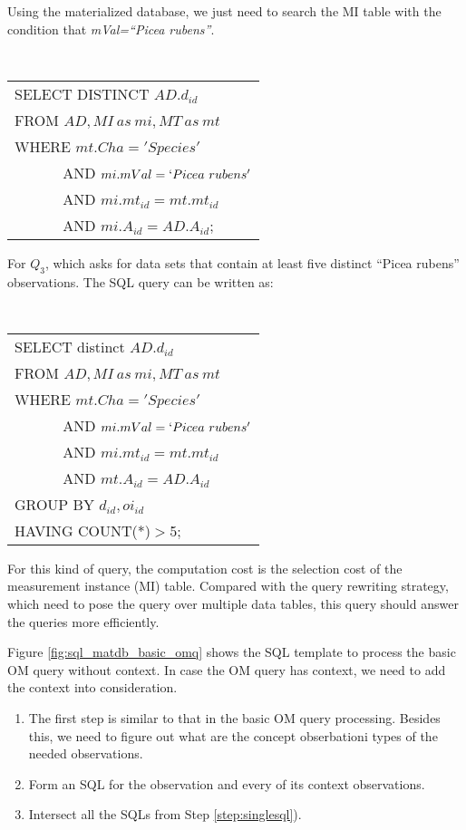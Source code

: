 \begin{example} \label{eg:materialize_db_q1}
Using the  materialized database,  we just need to search the MI table
with the condition that {\em mVal=``Picea rubens''}.

\vspace{0.1in}
{\tt 
\begin{tabular}{l}
SELECT DISTINCT $AD.d_{id}$\\
FROM $AD, MI~as~mi, MT~as~mt$\\ 
WHERE $mt.Cha='Species'$ \\
$\qquad\quad$ AND $mi.mVal = `Picea~rubens'$\\
$\qquad\quad$ AND $mi.mt_{id}=mt.mt_{id}$\\
$\qquad\quad$ AND $mi.A_{id}=AD.A_{id}$; 
\end{tabular}
}
\vspace{0.1in}

For $Q_3$, which asks for data sets that contain at
least five distinct ``Picea rubens'' observations.
The SQL query can be written as: 

\vspace{0.1in}
{\tt 
\begin{tabular}{l}
SELECT distinct $AD.d_{id}$\\
FROM $AD, MI~as~mi, MT~as~mt$\\
WHERE $mt.Cha='Species'$ \\
$\qquad\quad$ AND $mi.mVal = `Picea~rubens'$\\
$\qquad\quad$ AND $mi.mt_{id}=mt.mt_{id}$\\
$\qquad\quad$ AND $mt.A_{id}=AD.A_{id}$\\
GROUP BY $d_{id},oi_{id}$\\
HAVING COUNT(*)$>$5; 
\end{tabular}
}
\vspace{0.1in}
\end{example}

For this kind of query, the computation cost is the selection cost of the
measurement instance (MI) table. 
Compared with the query rewriting strategy, which need to pose the
query over multiple data tables, this query should answer the queries
more efficiently. 

Figure \ref{fig:sql_matdb_basic_omq} shows the SQL template to process
the basic OM query without context. In case the OM query has context,
we need to add the context into consideration. 

\begin{enumerate}
\item The first step is similar to that in the basic OM query
  processing. Besides this, we need to figure out what are the concept
  obserbationi types of the needed observations.  
\item \label{step:singlesql} Form an SQL for the observation and every of its context
  observations. 
\item Intersect all the SQLs from Step \ref{step:singlesql}). 
\end{enumerate}


